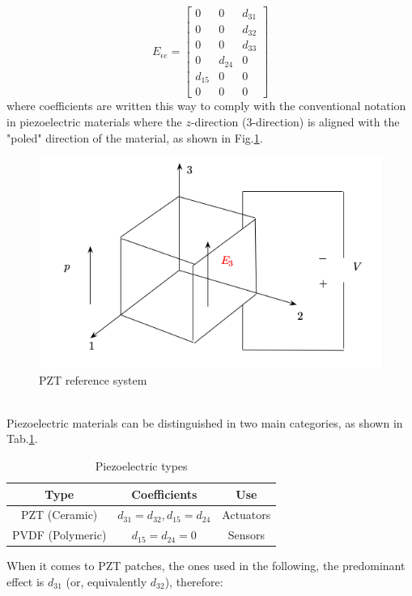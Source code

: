 \documentclass[twocolumn,a4paper,10pt,english]{article}
\begin{document}
            \[
            E_{\epsilon e}=
            \begin{bmatrix}
            0 & 0 & d_{31}\\ 	0 & 0 & d_{32}\\ 	0 & 0 & d_{33}\\
            0 & d_{24} & 0\\    d_{15} & 0 & 0\\    0 & 0 & 0
            \end{bmatrix}
            \]
            where coefficients are written this way to comply with the conventional notation in piezoelectric materials where the $z$-direction (3-direction) is aligned with the "poled" direction of the material, as shown in Fig.\ref{fig:pzt}.
            \begin{figure}[htp]
            	\centering
            	\includegraphics[width=0.7\linewidth]{images/pzt31.png}
            	\caption{PZT reference system}
            	\label{fig:pzt}
            \end{figure}\\
            Piezoelectric materials can be distinguished in two main categories, as shown in Tab.\ref{tab:piezo}.
            \begin{table}[H]
            	\begin{tabular}{|c|c|c|}      
            		\hline      		
            		\textbf{Type} & \textbf{Coefficients} & \textbf{Use}\\ 
            		\hline           		
            		PZT (Ceramic) & $d_{31}=d_{32}, d_{15}=d_{24}$ & Actuators \\
            		\hline
            		PVDF (Polymeric) & $d_{15}=d_{24}=0$ & Sensors \\
            		\hline
            	\end{tabular}
            	\caption{Piezoelectric types}
            	\label{tab:piezo}
            \end{table}
             When it comes to PZT patches, the ones used in the following, the predominant effect is $d_{31}$ (or, equivalently $d_{32}$), therefore:
\end{document}
